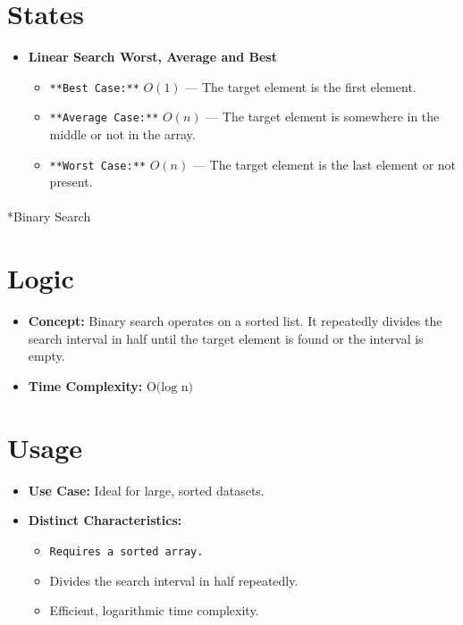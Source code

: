 \documentclass[
  letterpaper,
  DIV=11,
  numbers=noendperiod]{scrreprt}
\makeatletter
\let\oldparagraph\paragraph
\renewcommand{\paragraph}{
    \@ifstar
      \xxxParagraphStar
      \xxxParagraphNoStar
  }
\newcommand{\xxxParagraphStar}[1]{\oldparagraph*{#1}\mbox{}}
\newcommand{\xxxParagraphNoStar}[1]{\oldparagraph{#1}\mbox{}}
\providecommand{\tightlist}{%
  \setlength{\itemsep}{0pt}\setlength{\parskip}{0pt}}
\makeatother
\begin{document}
\section{States}

\begin{itemize}
\item
  \textbf{Linear Search Worst, Average and Best}

  \begin{itemize}
  \tightlist
  \item
    \texttt{**Best\ Case:**} \(O(1)\) --- The target element is the
    first element.
  \item
    \texttt{**Average\ Case:**} \(O(n)\) --- The target element is
    somewhere in the middle or not in the array.
  \item
    \texttt{**Worst\ Case:**} \(O(n)\) --- The target element is the
    last element or not present.
  \end{itemize}
\end{itemize}

\paragraph*{Binary Search}\label{binary-search-1}

\section{Logic}

\begin{itemize}
\tightlist
\item
  \textbf{Concept:} Binary search operates on a sorted list. It
  repeatedly divides the search interval in half until the target
  element is found or the interval is empty.
\item
  \textbf{Time Complexity:} \(\text{O(log⁡ n)}\)
\end{itemize}

\section{Usage}

\begin{itemize}
\item
  \textbf{Use Case:} Ideal for large, sorted datasets.
\item
  \textbf{Distinct Characteristics:}

  \begin{itemize}
  \tightlist
  \item
    \texttt{Requires\ a\ sorted\ array.}
  \item
    Divides the search interval in half repeatedly.
  \item
    Efficient, logarithmic time complexity.
  \end{itemize}
\end{itemize}
\end{document}
